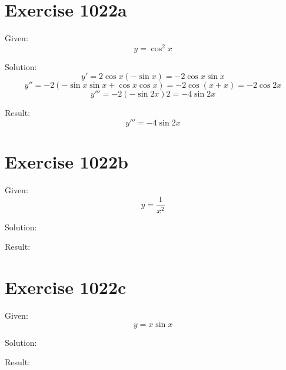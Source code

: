 \documentclass[a4paper, 10pt]{scrartcl}
\begin{document}
\section{Exercise 1022a}

Given:
\[
y = \cos^{2}{x}
\]

Solution:
\[
y' = 2\cos{x}(-\sin{x}) = -2\cos{x}\sin{x}
\]
\[
y'' = -2(-\sin{x}\sin{x} + \cos{x}\cos{x}) = -2\cos{(x + x)} = -2\cos{2x}
\]
\[
y''' = -2(-\sin{2x})2 = -4\sin{2x}
\]

Result:
\[
y''' = -4\sin{2x}
\]

\section{Exercise 1022b}

Given:
\[
y = \frac{1}{x^{2}}
\]

Solution:

Result:

\section{Exercise 1022c}

Given:
\[
y = x\sin{x}
\]

Solution:

Result:
\end{document}
